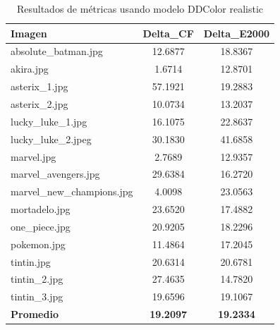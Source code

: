 \documentclass[a4paper]{article}
\begin{document}
\begin{table}[ht]
	\centering
	\begin{tabular}{lcc}
		\hline
		\textbf{Imagen} & \textbf{Delta\_CF} & \textbf{Delta\_E2000} \\
		\hline
		absolute\_batman.jpg      & 12.6877 & 18.8367 \\
		akira.jpg                 & 1.6714  & 12.8701 \\
		asterix\_1.jpg            & 57.1921 & 19.2883 \\
		asterix\_2.jpg            & 10.0734 & 13.2037 \\
		lucky\_luke\_1.jpg        & 16.1075 & 22.8637 \\
		lucky\_luke\_2.jpeg       & 30.1830 & 41.6858 \\
		marvel.jpg                & 2.7689  & 12.9357 \\
		marvel\_avengers.jpg      & 29.6384 & 16.2720 \\
		marvel\_new\_champions.jpg & 4.0098 & 23.0563 \\
		mortadelo.jpg             & 23.6520 & 17.4882 \\
		one\_piece.jpg            & 20.9205 & 18.2296 \\
		pokemon.jpg               & 11.4864 & 17.2045 \\
		tintin.jpg                & 20.6314 & 20.6781 \\
		tintin\_2.jpg             & 27.4635 & 14.7820 \\
		tintin\_3.jpg             & 19.6596 & 19.1067 \\
		\hline
		\textbf{Promedio} & \textbf{19.2097} & \textbf{19.2334} \\
		\hline
	\end{tabular}
	\caption{Resultados de métricas usando modelo DDColor realistic}
	\label{tab:resultados_realistic}
\end{table}
\end{document}
